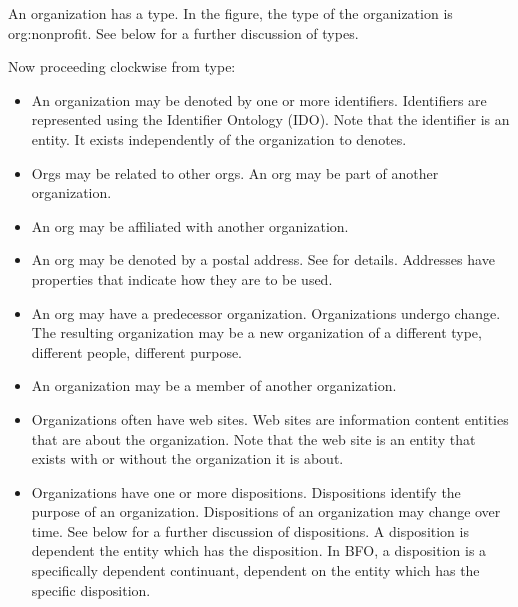 \documentclass[letterpaper,10pt,english]{sphinxmanual}
\begin{document}
\sphinxAtStartPar
An organization has a type.  In the figure, the type of the organization is
org:non\sphinxhyphen{}profit.  See below for a further discussion of types.

\sphinxAtStartPar
Now proceeding clockwise from type:
\begin{itemize}
\item {} 
\sphinxAtStartPar
An organization may be denoted by one or more identifiers.  Identifiers are represented
using the Identifier Ontology (IDO).  Note that the identifier is an entity.  It exists
independently of the organization to denotes.

\item {} 
\sphinxAtStartPar
Orgs may be related to other orgs.  An org may be part of another organization.

\item {} 
\sphinxAtStartPar
An org may be affiliated with another organization.

\item {} 
\sphinxAtStartPar
An org may be denoted by a postal address.  See {\hyperref[\detokenize{addresses::doc}]{}} for
details.  Addresses have
properties that indicate how they are to be used.

\item {} 
\sphinxAtStartPar
An org may have a predecessor organization.  Organizations undergo change.  The
resulting
organization may be a new organization of a different type, different people, different
purpose.

\item {} 
\sphinxAtStartPar
An organization may be a member of another organization.

\item {} 
\sphinxAtStartPar
Organizations often have web sites.  Web sites are information content entities that are
about the organization.  Note that the web site is an entity that exists with or without
the organization it is about.

\item {} 
\sphinxAtStartPar
Organizations have one or more dispositions.  Dispositions identify the purpose of an
organization.  Dispositions of an organization may change over time.  See below for a
further discussion of dispositions.  A disposition is dependent the entity which
has the disposition.  In BFO, a disposition is a specifically dependent continuant,
dependent on the entity which has the specific disposition.


\end{itemize}
\end{document}
